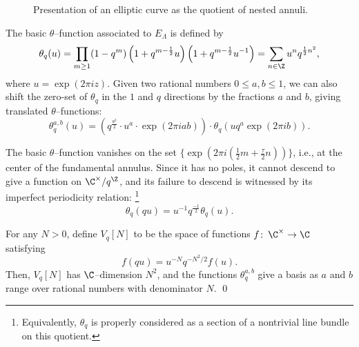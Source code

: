 \begin{figure}
\begin{center}
\end{center}
\caption{Presentation of an elliptic curve as the quotient of nested annuli.}\label{AnnulusPicture}
\end{figure}

\begin{definition}
The basic \(\theta\)--function associated to \(E_\Lambda\) is defined by \[\theta_q(u) = \prod_{m \ge 1} (1 - q^m) \left(1 + q^{m-\frac{1}{2}}u\right) \left(1 + q^{m-\frac{1}{2}}u^{-1}\right) = \sum_{n \in \Z} u^n q^{\frac{1}{2} n^2},\] where $u = \exp(2 \pi i z)$.
Given two rational numbers \(0 \le a, b \le 1\), we can also shift the zero-set of \(\theta_q\) in the \(1\) and \(q\) directions by the fractions \(a\) and \(b\), giving translated \(\theta\)--functions: \[\theta_q^{a,b}(u) = \left(q^{\frac{a^2}{2}} \cdot u^a \cdot \exp(2 \pi i a b) \right) \cdot \theta_q(u q^a \exp(2 \pi i b)).\]
\end{definition}

The basic \(\theta\)--function vanishes on the set \(\{\exp(2 \pi i (\frac{1}{2}m + \frac{\tau}{2}n))\}\), i.e., at the center of the fundamental annulus.
Since it has no poles, it cannot descend to give a function on \(\C^\times / q^{\Z}\), and its failure to descend is witnessed by its imperfect periodicity relation:%
\footnote{%
Equivalently, \(\theta_q\) is properly considered as a section of a nontrivial line bundle on this quotient.
}
\[\theta_q(qu) = u^{-1} q^{\frac{-1}{2}} \theta_q(u).\]

\begin{lemma}
For any \(N > 0\), define \(V_q[N]\) to be the space of functions \(f\co \C^\times \to \C\) satisfying \[f(q u) = u^{-N} q^{-N^2/2} f(u).\]
Then, \(V_q[N]\) has \(\C\)--dimension \(N^2\), and the functions \(\theta_q^{a, b}\) give a basis as \(a\) and \(b\) range over rational numbers with denominator \(N\). \qed
\end{lemma}

